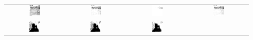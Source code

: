 \documentclass[main]{subfiles}
\begin{document}
\begin{table}
\begin{tabular}{c||c|c|c}
\includegraphics[width=0.2\textwidth]{img/res/e1a/alg1tipo1-09.jpg} &
\includegraphics[width=0.2\textwidth]{img/res/e1a/alg1tipo6-09.jpg} &
\includegraphics[width=0.2\textwidth]{img/res/e1a/alg1tipo6d0.75-09.jpg} &
\includegraphics[width=0.2\textwidth]{img/res/e1a/alg1tipo6d1.25-09.jpg} \\
\includegraphics[width=0.2\textwidth]{img/res/e1a/alg1tipo1-07.jpg} &
\includegraphics[width=0.2\textwidth]{img/res/e1a/alg1tipo6-07.jpg} &
\includegraphics[width=0.2\textwidth]{img/res/e1a/alg1tipo6d0.75-07.jpg} &

\end{tabular}
\end{table}
\end{document}
